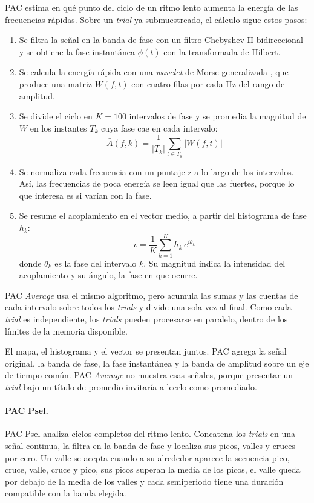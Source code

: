 \documentclass[12pt,letterpaper,oneside]{article}
\begin{document}
PAC estima en qué punto del ciclo de un ritmo lento aumenta la energía de las frecuencias rápidas. Sobre un \textit{trial} ya submuestreado, el cálculo sigue estos pasos:

\begin{enumerate}
  \item Se filtra la señal en la banda de fase con un filtro Chebyshev II bidireccional y se obtiene la fase instantánea $\phi(t)$ con la transformada de Hilbert.
  \item Se calcula la energía rápida con una \textit{wavelet} de Morse generalizada \cite{lilly2012}, que produce una matriz $W(f,t)$ con cuatro filas por cada Hz del rango de amplitud.
  \item Se divide el ciclo en $K=100$ intervalos de fase y se promedia la magnitud de $W$ en los instantes $T_k$ cuya fase cae en cada intervalo:
  \[
    \bar{A}(f,k) = \frac{1}{|T_k|}\sum_{t\in T_k}\left|W(f,t)\right|
  \]
  \item Se normaliza cada frecuencia con un puntaje z a lo largo de los intervalos. Así, las frecuencias de poca energía se leen igual que las fuertes, porque lo que interesa es si varían con la fase.
  \item Se resume el acoplamiento en el vector medio, a partir del histograma de fase $h_k$:
  \[
    v = \frac{1}{K}\sum_{k=1}^{K} h_k\, e^{i\theta_k}
  \]
  donde $\theta_k$ es la fase del intervalo $k$. Su magnitud indica la intensidad del acoplamiento y su ángulo, la fase en que ocurre.
\end{enumerate}

PAC \textit{Average} usa el mismo algoritmo, pero acumula las sumas y las cuentas de cada intervalo sobre todos los \textit{trials} y divide una sola vez al final. Como cada \textit{trial} es independiente, los \textit{trials} pueden procesarse en paralelo, dentro de los límites de la memoria disponible.

El mapa, el histograma y el vector se presentan juntos. PAC agrega la señal original, la banda de fase, la fase instantánea y la banda de amplitud sobre un eje de tiempo común. PAC \textit{Average} no muestra esas señales, porque presentar un \textit{trial} bajo un título de promedio invitaría a leerlo como promediado.

\paragraph{PAC Psel.}

PAC Psel analiza ciclos completos del ritmo lento. Concatena los \textit{trials} en una señal continua, la filtra en la banda de fase y localiza sus picos, valles y cruces por cero. Un valle se acepta cuando a su alrededor aparece la secuencia pico, cruce, valle, cruce y pico, sus picos superan la media de los picos, el valle queda por debajo de la media de los valles y cada semiperiodo tiene una duración compatible con la banda elegida.
\end{document}
